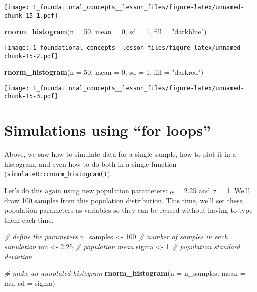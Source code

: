 \documentclass[
]{article}
\newenvironment{Shaded}{\begin{snugshade}}{\end{snugshade}}
\newcommand{\AttributeTok}[1]{\textcolor[rgb]{0.13,0.29,0.53}{#1}}
\newcommand{\CommentTok}[1]{\textcolor[rgb]{0.56,0.35,0.01}{\textit{#1}}}
\newcommand{\DecValTok}[1]{\textcolor[rgb]{0.00,0.00,0.81}{#1}}
\newcommand{\FloatTok}[1]{\textcolor[rgb]{0.00,0.00,0.81}{#1}}
\newcommand{\FunctionTok}[1]{\textcolor[rgb]{0.13,0.29,0.53}{\textbf{#1}}}
\newcommand{\NormalTok}[1]{#1}
\newcommand{\OtherTok}[1]{\textcolor[rgb]{0.56,0.35,0.01}{#1}}
\newcommand{\StringTok}[1]{\textcolor[rgb]{0.31,0.60,0.02}{#1}}
\begin{document}
\texttt{[image: 1\_foundational\_concepts\_\_lesson\_files/figure-latex/unnamed-chunk-15-1.pdf]}

\begin{Shaded}
\begin{Highlighting}[]
\FunctionTok{rnorm\_histogram}\NormalTok{(}\AttributeTok{n =} \DecValTok{50}\NormalTok{, }
                \AttributeTok{mean =} \DecValTok{0}\NormalTok{, }
                \AttributeTok{sd =} \DecValTok{1}\NormalTok{, }
                \AttributeTok{fill =} \StringTok{"darkblue"}\NormalTok{) }
\end{Highlighting}
\end{Shaded}

\texttt{[image: 1\_foundational\_concepts\_\_lesson\_files/figure-latex/unnamed-chunk-15-2.pdf]}

\begin{Shaded}
\begin{Highlighting}[]
\FunctionTok{rnorm\_histogram}\NormalTok{(}\AttributeTok{n =} \DecValTok{50}\NormalTok{, }
                \AttributeTok{mean =} \DecValTok{0}\NormalTok{, }
                \AttributeTok{sd =} \DecValTok{1}\NormalTok{, }
                \AttributeTok{fill =} \StringTok{"darkred"}\NormalTok{) }
\end{Highlighting}
\end{Shaded}

\texttt{[image: 1\_foundational\_concepts\_\_lesson\_files/figure-latex/unnamed-chunk-15-3.pdf]}

\hypertarget{simulations-using-for-loops}{%
\section{Simulations using ``for
loops''}\label{simulations-using-for-loops}}

Above, we saw how to simulate data for a single sample, how to plot it
in a histogram, and even how to do both in a single function
(\texttt{simulateR::rnorm\_histogram()}).

Let's do this again using new population parameters: \(\mu\) = 2.25 and
\(\sigma\) = 1. We'll draw 100 samples from this population
distribution. This time, we'll set these population parameters as
variables so they can be reused without having to type them each time.

\begin{Shaded}
\begin{Highlighting}[]
\CommentTok{\# define the parameters}
\NormalTok{n\_samples }\OtherTok{\textless{}{-}} \DecValTok{100} \CommentTok{\# number of samples in each simulation}
\NormalTok{mu }\OtherTok{\textless{}{-}} \FloatTok{2.25}       \CommentTok{\# population mean}
\NormalTok{sigma }\OtherTok{\textless{}{-}} \DecValTok{1}       \CommentTok{\# population standard deviation}

\CommentTok{\# make an annotated histogram}
\FunctionTok{rnorm\_histogram}\NormalTok{(}\AttributeTok{n =}\NormalTok{ n\_samples, }
                \AttributeTok{mean =}\NormalTok{ mu, }
                \AttributeTok{sd =}\NormalTok{ sigma)}
\end{Highlighting}
\end{Shaded}
\end{document}
